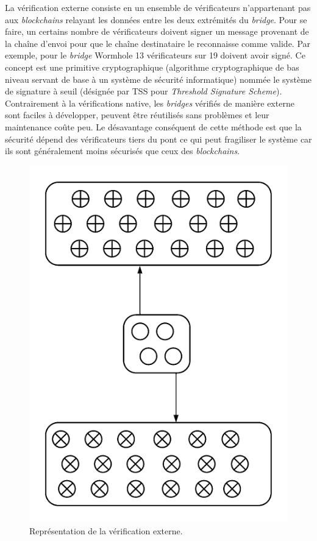 \pagebreak

La vérification externe consiste en un ensemble de vérificateurs n’appartenant pas aux \textit{blockchains} relayant les données entre les deux extrémités du \textit{bridge}. Pour se faire, un certains nombre de vérificateurs doivent signer un message provenant de la chaîne d’envoi pour que le chaîne destinataire le reconnaisse comme valide. Par exemple, pour le \textit{bridge} Wormhole 13 vérificateurs sur 19 doivent avoir signé\cite{NomadDocsExternal}. Ce concept est une primitive cryptographique (algorithme cryptographique de bas niveau servant de base à un système de sécurité informatique) nommée le système de signature à seuil (désignée par TSS pour \textit{Threshold Signature Scheme})\cite{BinanceTSS}. 
Contrairement à la vérifications native, les \textit{bridges} vérifiés de manière externe sont faciles à développer, peuvent être réutilisés sans problèmes et leur maintenance coûte peu. Le désavantage conséquent de cette méthode est que la sécurité dépend des vérificateurs tiers du pont ce qui peut fragiliser le système car ils sont généralement moins sécurisés que ceux des \textit{blockchains}. \\
\begin{figure}[h!]
    \centering
\includegraphics[scale=0.50]{centralisation/imagesBridges/DiagrammeVerifExterne.png}
\caption{Représentation de la vérification externe.}
\label{fig:ExternalVerif}
\end{figure}

